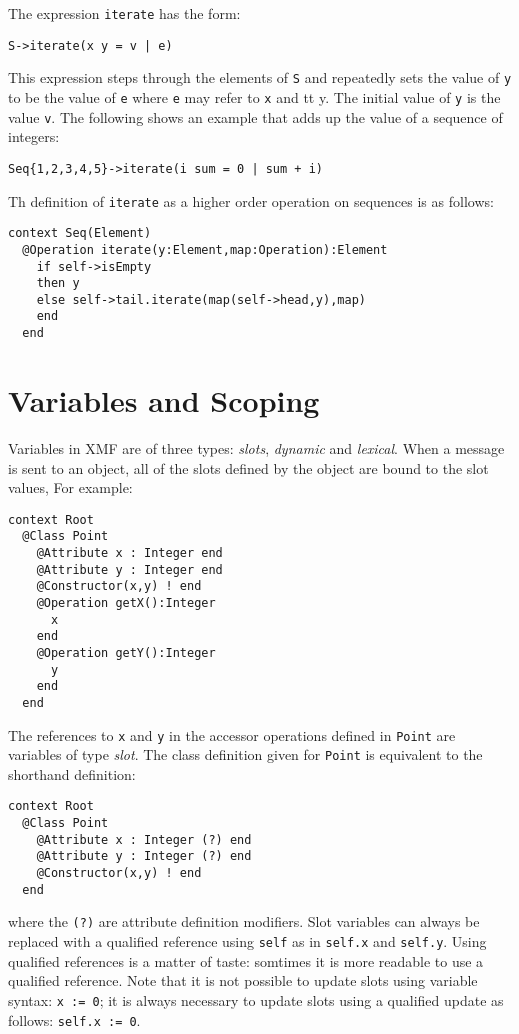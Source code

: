 \documentclass{article}
\begin{document}
\label{iteration}
The expression {\tt iterate} has the form:
\begin{verbatim}
S->iterate(x y = v | e)
\end{verbatim}
This expression steps through the elements of {\tt S} and repeatedly sets the value of {\tt y} to be
the value of {\tt e} where {\tt e} may refer to {\tt x} and {tt y}. The initial value of {\tt y} is
the value {\tt v}. The following shows an example that adds up the value of a sequence of integers:
\begin{verbatim}
Seq{1,2,3,4,5}->iterate(i sum = 0 | sum + i)
\end{verbatim}
Th definition of {\tt iterate} as a higher order operation on sequences is as follows:
\begin{verbatim}
context Seq(Element)
  @Operation iterate(y:Element,map:Operation):Element
    if self->isEmpty
    then y
    else self->tail.iterate(map(self->head,y),map)
    end
  end
\end{verbatim}

\section{Variables and Scoping}

Variables in XMF are of three types: {\em slots}, {\em dynamic} and {\em lexical}. When a message is
sent to an object, all of the slots defined by the object are bound to the slot values, For example:
\begin{verbatim}
context Root
  @Class Point
    @Attribute x : Integer end
    @Attribute y : Integer end
    @Constructor(x,y) ! end
    @Operation getX():Integer
      x
    end
    @Operation getY():Integer
      y
    end
  end
\end{verbatim}
The references to {\tt x} and {\tt y} in the accessor operations defined in {\tt Point} are variables
of type {\em slot}. The class definition given for {\tt Point} is equivalent to the shorthand
definition:
\begin{verbatim}
context Root
  @Class Point
    @Attribute x : Integer (?) end
    @Attribute y : Integer (?) end
    @Constructor(x,y) ! end
  end
\end{verbatim}
where the {\tt (?)} are attribute definition modifiers. Slot variables can always be replaced with a qualified reference using {\tt self}
as in {\tt self.x} and {\tt self.y}. Using qualified references is a matter of taste: somtimes it is
more readable to use a qualified reference. Note that it is not possible to update slots using variable
syntax: {\tt x := 0}; it is always necessary to update slots using a qualified update as follows:
{\tt self.x := 0}.
\end{document}
